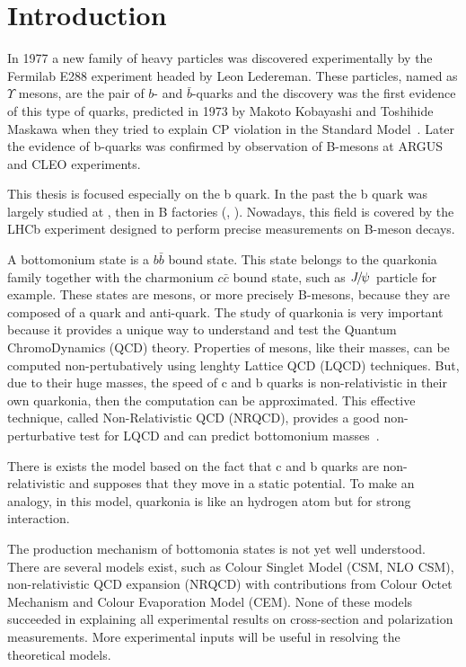 \chapter{Introduction}
In 1977 a new family of heavy particles was discovered experimentally by the
Fermilab E288 experiment headed by Leon Ledereman\cite{Herb:1977ek}. These
particles, named as $\Upsilon$ mesons, are the pair of $b$- and
$\bar{b}$-quarks and the discovery was the first evidence of this type of
quarks, predicted in 1973 by Makoto Kobayashi and Toshihide Maskawa when they
tried to explain CP violation in the Standard Model~\cite{Kobayashi:1973fv}.
Later the evidence of b-quarks was confirmed by observation of B-mesons at
ARGUS\cite{Albrecht:1986nr} and CLEO\cite{Bebek:1987bp} experiments.

This thesis is focused especially on the b quark. In the past the b
quark was largely studied at \lep, \tevatron then in B factories (\babar, \belle).
Nowadays, this field is covered by the LHCb experiment designed to perform
precise measurements on B-meson decays.

A bottomonium state is a $b\bar{b}$ bound state. This state belongs to the
quarkonia family together with the charmonium $c\bar{c}$ bound
state, such as ${{J\mskip -3mu/\mskip -2mu\psi\mskip 2mu}}$ particle for example. These states are mesons, or more
precisely B-mesons, because they are composed of a quark and anti-quark. The
study of quarkonia is very important because it provides a unique way to
understand and test the Quantum ChromoDynamics (QCD) theory. Properties of
mesons, like their masses, can be computed non-pertubatively using lenghty
Lattice QCD (LQCD) techniques. But, due to their huge masses, the speed of c
and b quarks is non-relativistic in their own quarkonia, then the computation
can be approximated. This effective technique, called Non-Relativistic QCD
(NRQCD), provides a good non-perturbative test for LQCD and can predict
bottomonium masses~\cite{Dowdall:2011iy,Dowdall:2012ab}.

There is exists the model based on the fact that c and b quarks are
non-relativistic and supposes that they move in a static
potential\cite{Kulshreshtha:1984mw,Parmar:2010ii,shah}. To make an analogy,
in this model, quarkonia is like an hydrogen atom but for strong interaction.

The production mechanism of bottomonia states is not yet well understood.
There are several models exist, such as Colour Singlet Model (CSM, NLO CSM),
non-relativistic QCD expansion (NRQCD) with contributions from Colour Octet
Mechanism and Colour Evaporation Model (CEM). None of these models succeeded in
explaining all experimental results on cross-section and polarization measurements.
More experimental inputs will be useful in resolving the theoretical models.

